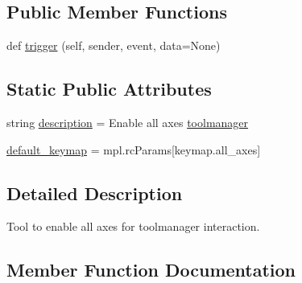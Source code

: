 \subsection*{Public Member Functions}
\begin{DoxyCompactItemize}
\item 
def \hyperlink{classmatplotlib_1_1backend__tools_1_1__ToolEnableAllNavigation_a94c495353d6a4d7f0b1d73461394cf54}{trigger} (self, sender, event, data=None)
\end{DoxyCompactItemize}
\subsection*{Static Public Attributes}
\begin{DoxyCompactItemize}
\item 
string \hyperlink{classmatplotlib_1_1backend__tools_1_1__ToolEnableAllNavigation_aa56c94a89bd87cef0e39bae24b3b7df8}{description} = \textquotesingle{}Enable all axes \hyperlink{classmatplotlib_1_1backend__tools_1_1ToolBase_aa7888dab7ba0552f93037f1df4b192f6}{toolmanager}\textquotesingle{}
\item 
\hyperlink{classmatplotlib_1_1backend__tools_1_1__ToolEnableAllNavigation_af3f89e9c0bb50464c2bc361d96f4ee16}{default\+\_\+keymap} = mpl.\+rc\+Params\mbox{[}\textquotesingle{}keymap.\+all\+\_\+axes\textquotesingle{}\mbox{]}
\end{DoxyCompactItemize}


\subsection{Detailed Description}
\begin{DoxyVerb}Tool to enable all axes for toolmanager interaction.\end{DoxyVerb}
 

\subsection{Member Function Documentation}
\mbox{\label{classmatplotlib_1_1backend__tools_1_1__ToolEnableAllNavigation_a94c495353d6a4d7f0b1d73461394cf54}} 

